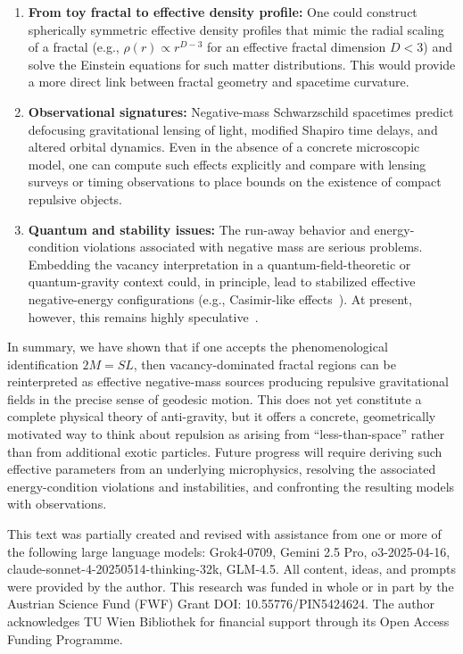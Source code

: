 \documentclass[%
  reprint,
  superscriptaddress,
  showpacs,
  showkeys,
  amsmath,amssymb,
  pra,
  longbibliography,
  floatfix,
  x11names
]{revtex4-2}
\begin{document}
\begin{enumerate}
\item \textbf{From toy fractal to effective density profile:} One could construct spherically symmetric effective density profiles that mimic the radial scaling of a fractal (e.g., \(\rho(r)\propto r^{D-3}\) for an effective fractal dimension \(D<3\)) and solve the Einstein equations for such matter distributions. This would provide a more direct link between fractal geometry and spacetime curvature.
\item \textbf{Observational signatures:} Negative-mass Schwarzschild spacetimes predict defocusing gravitational lensing of light, modified Shapiro time delays, and altered orbital dynamics. Even in the absence of a concrete microscopic model, one can compute such effects explicitly and compare with lensing surveys or timing observations to place bounds on the existence of compact repulsive objects.
\item \textbf{Quantum and stability issues:} The run-away behavior and energy-condition violations associated with negative mass are serious problems. Embedding the vacancy interpretation in a quantum-field-theoretic or quantum-gravity context could, in principle, lead to stabilized effective negative-energy configurations (e.g., Casimir-like effects~\cite{bekenstein-2013,costa-2022,kontou-2020}). At present, however, this remains highly speculative~\cite{Santiago22-PhysRevD.105.064038}.
\end{enumerate}

In summary, we have shown that if one accepts the phenomenological identification \(2M = SL\), then vacancy-dominated fractal regions can be reinterpreted as effective negative-mass sources producing repulsive gravitational fields in the precise sense of geodesic motion. This does not yet constitute a complete physical theory of anti-gravity, but it offers a concrete, geometrically motivated way to think about repulsion as arising from ``less-than-space'' rather than from additional exotic particles. Future progress will require deriving such effective parameters from an underlying microphysics, resolving the associated energy-condition violations and instabilities, and confronting the resulting models with observations.

\begin{acknowledgments}
This text was partially created and revised with assistance from one or more of the following large language models: Grok4-0709, Gemini 2.5 Pro, o3-2025-04-16, claude-sonnet-4-20250514-thinking-32k, GLM-4.5. All content, ideas, and prompts were provided by the author.
This research was funded in whole or in part by the Austrian Science Fund (FWF) Grant DOI: 10.55776/PIN5424624.
The author acknowledges TU Wien Bibliothek for financial support through its Open Access Funding Programme.
\end{acknowledgments}


\end{document}
